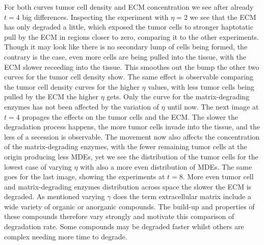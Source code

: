 For both curves tumor cell density and ECM concentration we see after already $t=4$ big differences. Inspecting the experiment with $\eta=2$ we see that the ECM has only degraded a little, which exposed the tumor cells to stronger haptotatic pull by the ECM in regions closer to zero, comparing it to the other experiments. Though it may look like there is no secondary lump of cells being formed, the contrary is the case, even more cells are being pulled into the tissue, with the ECM slower receeding into the tissue. This smoothes out the bump the other two curves for the tumor cell density show. The same effect is observable comparing the tumor cell density curves for the higher $\eta$ values, with less tumor cells being pulled by the ECM the higher $\eta$ gets. Only the curve for the matrix-degrading enzymes has not been affected by the variation of $\eta$ until now.\newline
The next image at $t=4$ propages the effects on the tumor cells and the ECM. The slower the degradation process happens, the more tumor cells invade into the tissue, and the less of a secession is observable. The movement now also affects the concentration of the matrix-degrading enzymes, with the fewer remaining tumor cells at the origin producing less MDEs, yet we see the distribution of the tumor cells for the lowest case of varying $\eta$ with also a more even distribution of MDEs.\newline
The same goes for the last image, showing the experiments at $t=8$. More even tumor cell and matrix-degrading enzymes distribution across space the slower the ECM is degraded.\newline 
As mentioned varying $\gamma$ does the term extracellular matrix include a wide variety of organic or anorganic compounds. The build-up and properties of these compounds therefore vary strongly and motivate this comparison of degradation rate. Some compounds may be degraded faster whilst others are complex needing more time to degrade. 

